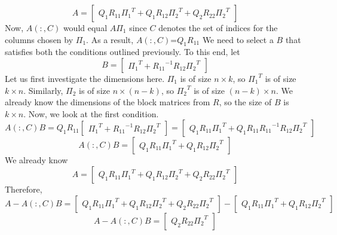 \documentclass[12pt]{article}
\begin{document}
\[A = \begin{bmatrix} Q_1R_{11}{\Pi_1}^T+Q_1R_{12}{\Pi_2}^T+Q_2R_{22}{\Pi_2}^T\end{bmatrix}\]
Now, $A(:,C)$ would equal $A\Pi_1$ since $C$ denotes the set of indices for the columns chosen by $\Pi_1$. As a result, $A(:,C)$=$Q_1R_{11}$
We need to select a $B$ that satisfies both the conditions outlined previously. To this end, let \[B=\begin{bmatrix}{\Pi_1}^T+{R_{11}}^{-1}R_{12}{\Pi_2}^T\end{bmatrix}\]
Let us first investigate the dimensions here. $\Pi_1$ is of size  $n \times k$, so ${\Pi_1}^T$ is of size  $k \times n$. Similarly, $\Pi_2$ is of size  $n \times (n-k)$, so ${\Pi_2}^T$ is of size  $(n - k) \times n$. We already know the dimensions of the block matrices from $R$, so the size of $B$ is  $k \times n$.
Now, we look at the first condition. \[
    A(:,C)B = Q_1R_{11}\begin{bmatrix} {\Pi_1}^T+{R_{11}}^{-1}R_{12}{\Pi_2}^T \end{bmatrix} = \begin{bmatrix} Q_1R_{11}{\Pi_1}^T + Q_1R_{11}{R_{11}}^{-1}R_{12}{\Pi_2}^T\end{bmatrix}
\]
\[
    A(:,C)B = \begin{bmatrix} Q_1R_{11}{\Pi_1}^T + Q_1R_{12}{\Pi_2}^T\end{bmatrix}
\]
We already know \[A = \begin{bmatrix} Q_1R_{11}{\Pi_1}^T+Q_1R_{12}{\Pi_2}^T+Q_2R_{22}{\Pi_2}^T\end{bmatrix}\]
Therefore, \[A - A(:,C)B = \begin{bmatrix} Q_1R_{11}{\Pi_1}^T+Q_1R_{12}{\Pi_2}^T+Q_2R_{22}{\Pi_2}^T\end{bmatrix}-\begin{bmatrix} Q_1R_{11}{\Pi_1}^T + Q_1R_{12}{\Pi_2}^T\end{bmatrix}\]
\[A - A(:,C)B = \begin{bmatrix}Q_2R_{22}{\Pi_2}^T\end{bmatrix}\]
\end{document}
